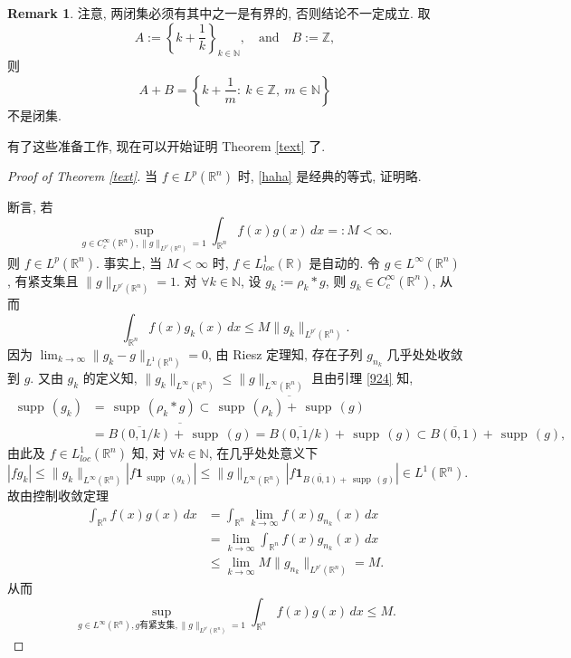 \documentclass[a4paper,11pt]{article}
\theoremstyle{definition}
\newtheorem{remark}[theorem]{Remark}
\def \supp {\mathop\mathrm{\,supp\,}}
\begin{document}
\begin{CJK*}{UTF8}{gbsn}
\begin{remark}
    注意, 两闭集必须有其中之一是有界的, 否则结论不一定成立.
    取 
    $$ 
        A := \left\{ k + \frac{1}{k} \right\}_{k \in \mathbb{N}}, 
        \quad \text{and} \quad 
        B := \mathbb{Z},
    $$ 
    则
    $$
        A + B = \left\{ k + \frac{1}{m}:\ k \in \mathbb{Z},\ m \in \mathbb{N} \right\}
    $$
    不是闭集.
\end{remark}

有了这些准备工作, 现在可以开始证明 Theorem \ref{text} 了.

\begin{proof}[Proof of Theorem \ref{text}]
    当 $ f \in L^p(\mathbb{R}^n) $ 时, \eqref{haha} 是经典的等式, 证明略.
    
    断言, 若
    $$
        \sup_{g \in C_c^\infty(\mathbb{R}^n), \| g \|_{L^{p'}(\mathbb{R}^n)} = 1} 
            \int_{\mathbb{R}^n} f(x) g(x) \, dx =: M < \infty.
    $$
    则 $ f \in L^p(\mathbb{R}^n) $.
    事实上, 当 $ M < \infty $ 时, $ f \in L_{loc}^1(\mathbb{R}) $ 是自动的.
    令 $ g \in L^\infty(\mathbb{R}^n) $, 有紧支集且 $ \| g \|_{L^{p'}(\mathbb{R}^n)} = 1 $.
    对 $ \forall k \in \mathbb{N} $, 设 $ g_k := \rho_k * g $, 则 $ g_k \in C_c^\infty(\mathbb{R}^n) $,
    从而
    $$
        \int_{\mathbb{R}^n} f(x) g_k(x) \, dx \leq M \| g_k \|_{L^{p'}(\mathbb{R}^n)}.
    $$
    因为 $ \lim_{k \to \infty} \| g_k - g \|_{L^1(\mathbb{R}^n)} = 0 $, 由 Riesz 定理知, 
    存在子列 $ g_{n_k} $ 几乎处处收敛到 $ g $. 又由 $ g_k $ 的定义知, 
    $ \|g_k\|_{L^\infty(\mathbb{R}^n)} \leq \|g\|_{L^\infty(\mathbb{R}^n)} $ 
    且由引理 \ref{924} 知,
    \begin{align*}
        \supp(g_k) &= \supp(\rho_k * g) 
                   \subset \overline{\supp(\rho_k) + \supp(g)} \\
                   &= \overline{\overline{B(0, 1/k)} + \supp(g)} 
                   = \overline{B(0, 1/k)} + \supp(g)
                   \subset \overline{B(0, 1)} + \supp(g), 
    \end{align*}
    由此及 $ f \in L^1_{loc}(\mathbb{R}^n) $ 知, 
    对 $ \forall k \in \mathbb{N} $, 在几乎处处意义下
    $$
        |f g_k| \leq \|g_k\|_{L^\infty(\mathbb{R}^n)} |f \mathbf{1}_{\supp(g_k)}|
                \leq \|g\|_{L^\infty(\mathbb{R}^n)} \left|f \mathbf{1}_{\overline{B(0, 1)} + \supp(g)}\right| 
                \in L^1(\mathbb{R}^n).
    $$
    故由控制收敛定理
    \begin{align*}
        \int_{\mathbb{R}^n} f(x) g(x) \, dx
            &= \int_{\mathbb{R}^n} \lim_{k \to \infty} f(x) g_{n_k}(x) \, dx \\
            &= \lim_{k \to \infty} \int_{\mathbb{R}^n} f(x) g_{n_k}(x) \, dx \\
            &\leq \lim_{k \to \infty} M \| g_{n_k} \|_{L^{p'}(\mathbb{R}^n)}
            = M.
    \end{align*}
    从而
    $$
        \sup_{g \in L^\infty(\mathbb{R}^n), g \text{有紧支集}, \| g \|_{L^{p'}(\mathbb{R}^n)} = 1} 
            \int_{\mathbb{R}^n} f(x) g(x) \, dx \leq M.
    $$
    

\end{proof}
\end{CJK*}
\end{document}
